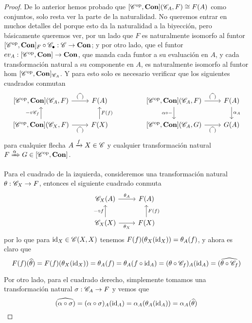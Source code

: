 \documentclass{comunicaciones}
\begin{document}
\begin{proof}
    De lo anterior hemos probado que $[\mathscr C^{\mathrm{op}},\mathbf{Con}](\mathscr C_A,F)\cong F(A)$ como conjuntos, solo resta ver la parte de la naturalidad. No queremos entrar en muchos detalles
    del porque esto da la naturalidad a la biyección, pero básicamente queremos ver, por un lado que $F$ es naturalmente isomorfo al funtor 
    $[\mathscr C^{\mathrm{op}},\mathbf{Con}]_F\circ\mathscr C_\bullet:\mathscr C\to\mathbf{Con}$; y por otro lado, que el funtor $ev_A:[\mathscr C^{\mathrm{op}},\mathbf{Con}]\to\mathbf{Con}$, que manda cada funtor a su evaluación en $A$, y cada
    transformación natural a su componente en $A$, es naturalmente isomorfo al funtor hom $[\mathscr C^{\mathrm{op}},\mathbf{Con}]_{\mathscr C_A}$. Y para esto solo es necesario verificar que los siguientes 
    cuadrados conmutan
    \[\begin{tikzcd}
        {[\C^\op,\Con](\C_A,F)} & {F(A)} && {[\C^\op,\Con](\C_A,F)} & {F(A)} \\
        {[\C^\op,\Con](\C_X,F)} & {F(X)} && {[\C^\op,\Con](\C_A,G)} & {G(A)}
        \arrow["{(\widehat{\phantom{a}})}", from=1-1, to=1-2]
        \arrow["{(\widehat{\phantom{a}})}", from=1-4, to=1-5]
        \arrow["{\alpha\circ -}"', from=1-4, to=2-4]
        \arrow["{\alpha_A}", from=1-5, to=2-5]
        \arrow["{-\circ \C_f}", from=2-1, to=1-1]
        \arrow["{(\widehat{\phantom{a}})}"', from=2-1, to=2-2]
        \arrow["{F(f)}"', from=2-2, to=1-2]
        \arrow["{(\widehat{\phantom{a}})}"', from=2-4, to=2-5]
    \end{tikzcd}\]
    para cualquier flecha $A\xrightarrow{f}X\in\mathscr C$ y cualquier transformación natural $F\xRightarrow{\alpha}G\in [\mathscr C^{\mathrm{op}},\mathbf{Con}]$.

    Para el cuadrado de la izquierda, consideremos una transformación natural $\theta:\mathscr C_X\to F$, entonces el siguiente cuadrado conmuta
    \[\begin{tikzcd}
        {\C_X(A)} & {F(A)} \\
        {\C_X(X)} & {F(X)}
        \arrow["{\theta_A}", from=1-1, to=1-2]
        \arrow["{-\circ f}", from=2-1, to=1-1]
        \arrow["{\theta_X}"', from=2-1, to=2-2]
        \arrow["{F(f)}"', from=2-2, to=1-2]
    \end{tikzcd}\]
    por lo que para $\mathrm{id}_X\in\mathscr C(X,X)$ tenemos $F(f)(\theta_X(\mathrm{id}_X))=\theta_A(f)$, y ahora es claro que
    \[ F(f)(\widehat{\theta})=F(f)(\theta_X(\mathrm{id}_X))=\theta_A(f)=\theta_A(f\circ \mathrm{id}_A)=(\theta\circ\mathscr C_f)_A(\mathrm{id}_A)=\widehat{(\theta\circ\mathscr C_f)} \]
    
    Por otro lado, para el cuadrado derecho, simplemente tomamos una transformación natural $\sigma:\mathscr C_A\to F$ y vemos que
    \[ \widehat{(\alpha\circ\sigma)}=(\alpha\circ\sigma)_A(\mathrm{id}_A)=\alpha_A(\theta_A(\mathrm{id}_A))=\alpha_A(\widehat{\theta}) \]
\end{proof}
\end{document}
